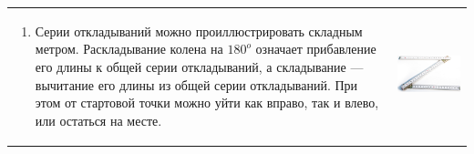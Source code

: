 \begin{tabular}{ll}
\begin{minipage}{0.6\linewidth}
\begin{enumerate}\setlength{\itemsep}{1pt}\setcounter{enumi}{6}
\item Серии откладываний можно проиллюстрировать складным метром. Раскладывание колена на $180^o$ означает прибавление его длины к общей серии откладываний, а складывание --- вычитание его длины из общей серии откладываний. При этом от стартовой точки можно уйти как вправо, так и влево, или остаться на месте.
\end{enumerate}
\end{minipage}
&
\begin{minipage}{0.4\linewidth}
\includegraphics[scale=0.3]{meter.png}
\end{minipage}
\end{tabular}

